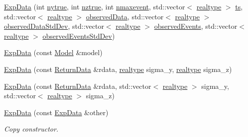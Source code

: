 \begin{DoxyCompactItemize}
\mbox{\hyperlink{classamici_1_1_exp_data_a3b747fc65e60e76d84831831eb7b8f49}{Exp\+Data}} (int \mbox{\hyperlink{classamici_1_1_exp_data_a54bcfe56ad0df183516d096adf4e0b26}{nytrue}}, int \mbox{\hyperlink{classamici_1_1_exp_data_a9a451378ba5572ef7a3fd4dd89e1c227}{nztrue}}, int \mbox{\hyperlink{classamici_1_1_exp_data_a48832d4f3a37c4fd75cc7f4ef578d1b1}{nmaxevent}}, std\+::vector$<$ \mbox{\hyperlink{namespaceamici_a1bdce28051d6a53868f7ccbf5f2c14a3}{realtype}} $>$ \mbox{\hyperlink{classamici_1_1_exp_data_aa7014a80e7b102f85a10e3b9a480e8e5}{ts}}, std\+::vector$<$ \mbox{\hyperlink{namespaceamici_a1bdce28051d6a53868f7ccbf5f2c14a3}{realtype}} $>$ \mbox{\hyperlink{classamici_1_1_exp_data_a6acedf749a3c5e4c4dcbc822f58a565d}{observed\+Data}}, std\+::vector$<$ \mbox{\hyperlink{namespaceamici_a1bdce28051d6a53868f7ccbf5f2c14a3}{realtype}} $>$ \mbox{\hyperlink{classamici_1_1_exp_data_aa097568cebb4be48c4c1dfaab0c2a159}{observed\+Data\+Std\+Dev}}, std\+::vector$<$ \mbox{\hyperlink{namespaceamici_a1bdce28051d6a53868f7ccbf5f2c14a3}{realtype}} $>$ \mbox{\hyperlink{classamici_1_1_exp_data_a629e6085839e16bac95ef0eba580f7f0}{observed\+Events}}, std\+::vector$<$ \mbox{\hyperlink{namespaceamici_a1bdce28051d6a53868f7ccbf5f2c14a3}{realtype}} $>$ \mbox{\hyperlink{classamici_1_1_exp_data_abb12a8f75b4e6c936ae6c0be770628c9}{observed\+Events\+Std\+Dev}})
\item 
\mbox{\hyperlink{classamici_1_1_exp_data_af4ce16765488e3857131aa5aea0c38b4}{Exp\+Data}} (const \mbox{\hyperlink{classamici_1_1_model}{Model}} \&model)
\item 
\mbox{\hyperlink{classamici_1_1_exp_data_a30619c6fa4a5f5cc07e7dcc0824aa0fc}{Exp\+Data}} (const \mbox{\hyperlink{classamici_1_1_return_data}{Return\+Data}} \&rdata, \mbox{\hyperlink{namespaceamici_a1bdce28051d6a53868f7ccbf5f2c14a3}{realtype}} sigma\+\_\+y, \mbox{\hyperlink{namespaceamici_a1bdce28051d6a53868f7ccbf5f2c14a3}{realtype}} sigma\+\_\+z)
\item 
\mbox{\hyperlink{classamici_1_1_exp_data_ac1cf98522f4ac1b25f33b6b3fdd69d95}{Exp\+Data}} (const \mbox{\hyperlink{classamici_1_1_return_data}{Return\+Data}} \&rdata, std\+::vector$<$ \mbox{\hyperlink{namespaceamici_a1bdce28051d6a53868f7ccbf5f2c14a3}{realtype}} $>$ sigma\+\_\+y, std\+::vector$<$ \mbox{\hyperlink{namespaceamici_a1bdce28051d6a53868f7ccbf5f2c14a3}{realtype}} $>$ sigma\+\_\+z)
\item 
\mbox{\hyperlink{classamici_1_1_exp_data_a8c5098f79b1a95e96f5cbdf2a55bef41}{Exp\+Data}} (const \mbox{\hyperlink{classamici_1_1_exp_data}{Exp\+Data}} \&other)
\begin{DoxyCompactList}\small\item\em Copy constructor. \end{DoxyCompactList}\item 

\end{DoxyCompactItemize}
